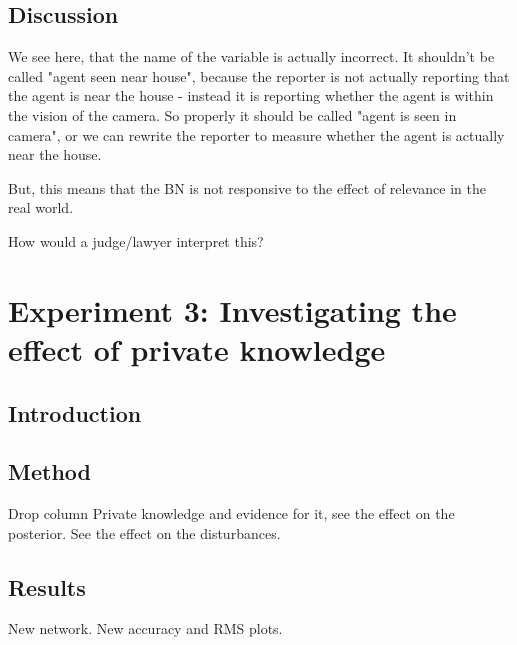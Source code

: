 \subsection{Discussion}
We see here, that the name of the variable is actually incorrect. It shouldn't be called "agent seen near house", because the reporter is not actually reporting that the agent is near the house - instead it is reporting whether the agent is within the vision of the camera. So properly it should be called "agent is seen in camera", or we can rewrite the reporter to measure whether the agent is actually near the house. 

But, this means that the BN is not responsive to the effect of relevance in the real world. 


How would a judge/lawyer interpret this?


\section{Experiment 3: Investigating the effect of private knowledge}

\subsection{Introduction}

\subsection{Method}
Drop column Private knowledge and evidence for it, see the effect on the posterior. See the effect on the disturbances.


\subsection{Results}
New network.
New accuracy and RMS plots.

